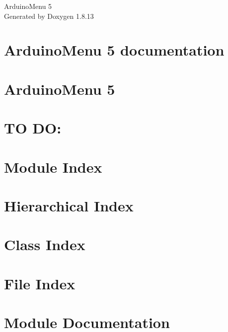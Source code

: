 \documentclass[twoside]{book}
\newcommand{\+}{\discretionary{\mbox{\scriptsize$\hookleftarrow$}}{}{}}
\newcommand{\clearemptydoublepage}{%
  \newpage{\pagestyle{empty}\cleardoublepage}%
}
\begin{document}
\hypersetup{pageanchor=false,
             bookmarksnumbered=true,
             pdfencoding=unicode
            }
\begin{titlepage}
\vspace*{7cm}
\begin{center}%
{\Large Arduino\+Menu 5 }\\
\vspace*{1cm}
{\large Generated by Doxygen 1.8.13}\\
\end{center}
\end{titlepage}
\clearemptydoublepage
{}
\tableofcontents
\clearemptydoublepage
{}
\hypersetup{pageanchor=true}

\chapter{Arduino\+Menu 5 documentation}
\label{index}\hypertarget{index}{}
\chapter{Arduino\+Menu 5}
\label{md_README}

\chapter{TO DO\+:}
\label{md_TODO}

\chapter{Module Index}

\chapter{Hierarchical Index}

\chapter{Class Index}

\chapter{File Index}

\chapter{Module Documentation}





\end{document}
